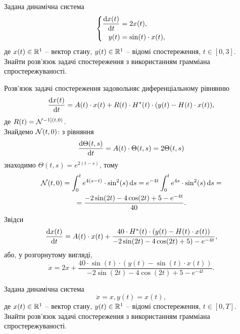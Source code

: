 \begin{problem}
    Задана динамічна система \[ \left\{ \begin{aligned} 
    	\frac{\mathop{}\!\mathrm{d} x(t)}{\mathop{}\!\mathrm{d} t} &= 2 x(t), \\
    	y(t) &= \sin (t) \cdot x(t),
    \end{aligned} \right. \]
    де $x(t) \in \mathbb{R}^1$ -- вектор стану, $y(t) \in \mathbb{R}^1$ -- відомі спостереження, $t \in [0, 3]$. Знайти розв'язок задачі спостереження з використанням грамміана спростережуваності.
\end{problem}

\begin{solution}
    Розв'язок задачі спостереження задовольняє диференціальному рівнянню \[ \frac{\mathop{}\!\mathrm{d} x(t)}{\mathop{}\!\mathrm{d} t} = A(t) \cdot x(t) + R(t) \cdot H^*(t) \cdot (y(t) - H(t) \cdot x(t)), \] де $R(t) = \mathcal{N}^{-1](t, 0)}$. \\

    Знайдемо $\mathcal{N}(t, 0)$: з рівняння \[ \frac{\mathop{}\!\mathrm{d} \Theta(t, s)}{\mathop{}\!\mathrm{d} t} = A(t)\cdot \Theta(t, s) = 2\Theta(t, s) \] знаходимо $\Theta(t, s) = e^{2 (t - s)}$, тому \begin{multline*} \mathcal{N}(t, 0) = \int_0^t e^{4 (s - t)} \cdot \sin^2(s) \mathop{}\!\mathrm{d} s = e^{-4t} \int_0^t e^{4 s} \cdot \sin^2(s) \mathop{}\!\mathrm{d} s = \\
    = \frac{-2 \sin (2t) - 4 \cos(2t) + 5 - e^{-4t}}{40}. \end{multline*} Звідси \[ \frac{\mathop{}\!\mathrm{d} x(t)}{\mathop{}\!\mathrm{d} t} = A(t) \cdot x(t) + \frac{40 \cdot H^*(t) \cdot (y(t) - H(t) \cdot x(t))}{-2 \sin (2t) - 4 \cos(2t) + 5) - e^{-4t}} , \] або, у розгорнутому вигляді, \[ \dot x = 2 x + \frac{40 \cdot \sin(t) \cdot (y(t) - \sin(t) \cdot x(t))}{-2 \sin (2t) - 4 \cos(2t) + 5 - e^{-4t}}. \]
\end{solution}

\begin{problem}
    Задана динамічна система \[ \ddot x = x, y(t) = x(t),\] де $x(t) \in \mathbb{R}^1$ -- вектор стану, $y(t) \in \mathbb{R}^1$ -- відомі спостереження, $t \in [0, T]$. Знайти розв'язок задачі спостереження з використанням грамміана спростережуваності.
\end{problem}

\begin{solution}
\end{solution}
